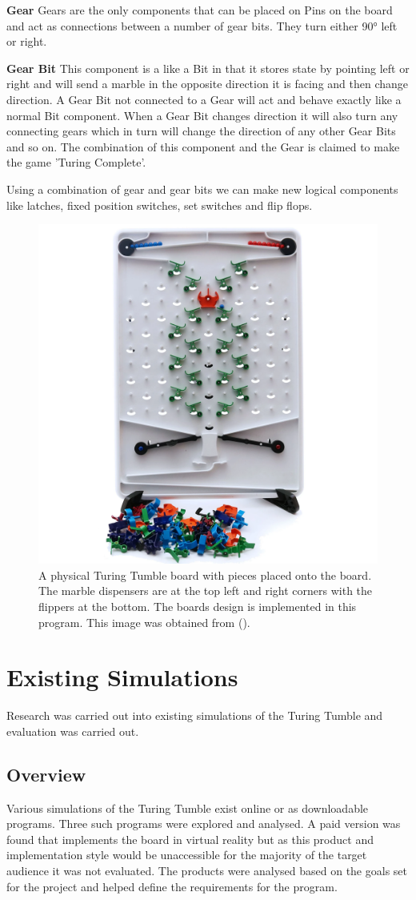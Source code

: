 \documentclass{l4proj}
\begin{document}
\textbf{Gear}
Gears are the only components that can be placed on Pins on the board and act as connections between a number of gear bits. They turn either 90° left or right. 

\textbf{Gear Bit}
This component is a like a Bit in that it stores state by pointing left or right and will send a marble in the opposite direction it is facing and then change direction. A Gear Bit not connected to a Gear will act and behave exactly like a normal Bit component. When a Gear Bit changes direction it will also turn any connecting gears which in turn will change the direction of any other Gear Bits and so on. The combination of this component and the Gear is claimed to make the game 'Turing Complete'.

Using a combination of gear and gear bits we can make new logical components like latches, fixed position switches, set switches and flip flops.

\begin{figure}
    \centering
    \includegraphics[width=0.5\linewidth]{images/turingTumbleBoard.png}
    \caption{A physical Turing Tumble board with pieces placed onto the board. The marble dispensers are at the top left and right corners with the flippers at the bottom. The boards design is implemented in this program. This image was obtained from (\cite{turing_tumble_picture}).}
    \label{fig:ttboard}
\end{figure}


\section{Existing Simulations}
Research was carried out into existing simulations of the Turing Tumble and evaluation was carried out.

\subsection{Overview}
Various simulations of the Turing Tumble exist online or as downloadable programs. Three such programs were explored and analysed. A paid version was found that implements the board in virtual reality but as this product and implementation style would be unaccessible for the majority of the target audience it was not evaluated. The products were analysed based on the goals set for the project and helped define the requirements for the program.
\end{document}
